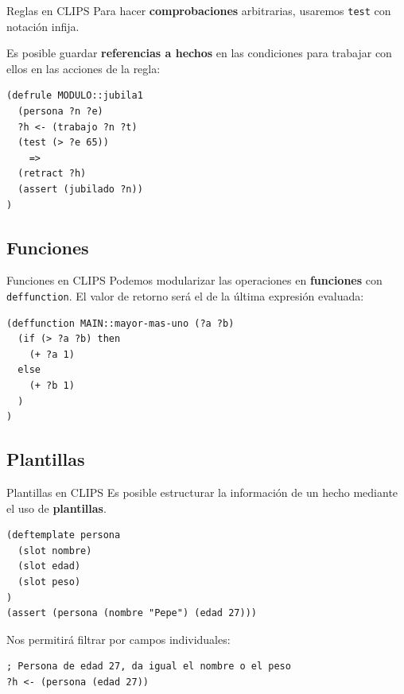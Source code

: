 \documentclass[smaller,spanish,xcolor=svgnames]{beamer}
\begin{document}
\begin{frame}[fragile]{Reglas en CLIPS}
  Para hacer \textbf{comprobaciones} arbitrarias, usaremos \texttt{test} con notación infija.

  \medskip

  Es posible guardar \textbf{referencias a hechos} en las condiciones para trabajar con
  ellos en las acciones de la regla:

\begin{verbatim}
(defrule MODULO::jubila1
  (persona ?n ?e)
  ?h <- (trabajo ?n ?t)
  (test (> ?e 65))
    =>
  (retract ?h)
  (assert (jubilado ?n))
)
\end{verbatim}  
\end{frame}

\subsection{Funciones}

\begin{frame}[fragile]{Funciones en CLIPS}
  Podemos modularizar las operaciones en \textbf{funciones} con \texttt{deffunction}. El
  valor de retorno será el de la última expresión evaluada:

\begin{verbatim}
(deffunction MAIN::mayor-mas-uno (?a ?b)
  (if (> ?a ?b) then
    (+ ?a 1)
  else
    (+ ?b 1)
  )
)
\end{verbatim}
\end{frame}

\subsection{Plantillas}

\begin{frame}[fragile]{Plantillas en CLIPS}
  Es posible estructurar la información de un hecho mediante el uso de
  \textbf{plantillas}.

\begin{verbatim}
(deftemplate persona
  (slot nombre)
  (slot edad)
  (slot peso)
)
(assert (persona (nombre "Pepe") (edad 27)))
\end{verbatim}

Nos permitirá filtrar por campos individuales:

\begin{verbatim}
; Persona de edad 27, da igual el nombre o el peso
?h <- (persona (edad 27))
\end{verbatim}
  
\end{frame}
\end{document}
